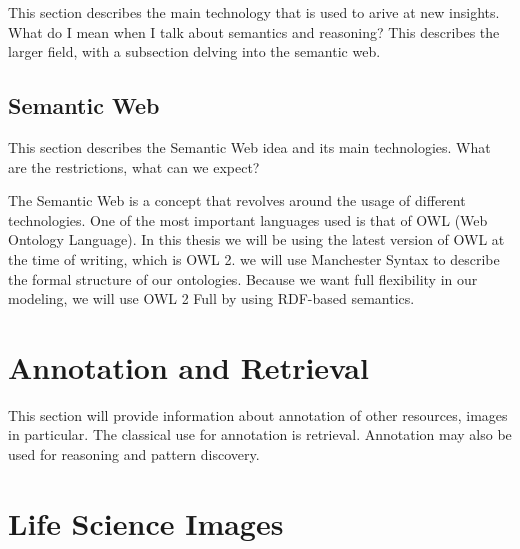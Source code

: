 This section describes the main technology that is used to arive at
new insights. What do I mean when I talk about
semantics and
reasoning? This describes the larger field,
with a subsection delving into the semantic web.


\subsection{Semantic Web}

This section describes the Semantic Web
idea and its main technologies. What are the restrictions, what can we
expect?

The Semantic Web is a concept that revolves around the usage of
different technologies. One of the most important languages used is
that of OWL (Web Ontology Language). In this thesis we will
be using the latest version of OWL at the time of writing, which is
OWL 2. we will use Manchester Syntax to
describe the formal structure of our
ontologies. Because we want full flexibility in our
modeling, we will use OWL 2 Full by using RDF-based
semantics.




\section{Annotation and Retrieval}

This section will provide information about
annotation of other resources, images in
particular. The classical use for annotation is
retrieval. Annotation may also be used for
reasoning and pattern discovery.


\section{Life Science Images}

